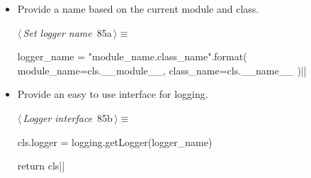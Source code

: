 \documentclass[%
    a4paper,    %
    justified,  %
    nobib,      %
    openany     %
]{tufte-book}
\begin{document}
\begin{itemize}
  \item Provide a name based on the current module and class.
    \begin{flushleft} \small
\begin{minipage}{\linewidth}\label{scrap57}\raggedright\small
{} $\langle\,${\itshape Set logger name}\nobreak\ {\footnotesize {85a}}$\,\rangle\equiv$
\vspace{-1ex}
\begin{pythoncode}
logger_name = "{module_name}.{class_name}".format(
    module_name=cls.__module__,
    class_name=cls.__name__
)|\NWsep|
\end{pythoncode}
\vspace{1.5ex}
\footnotesize
{}
\end{minipage}\vspace{4ex}
\end{flushleft}
\item Provide an easy to use interface for logging.
    \begin{flushleft} \small
\begin{minipage}{\linewidth}\label{scrap58}\raggedright\small
{} $\langle\,${\itshape Logger interface}\nobreak\ {\footnotesize {85b}}$\,\rangle\equiv$
\vspace{-1ex}
\begin{pythoncode}
cls.logger = logging.getLogger(logger_name)

return cls|\NWsep|
\end{pythoncode}
\vspace{1.5ex}
\footnotesize
{}
\end{minipage}\vspace{4ex}
\end{flushleft}
\end{itemize}
\end{document}
